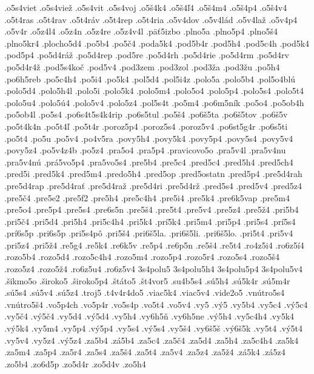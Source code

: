 {.o5s4viet
.o5s4vie\v z
.o5s4vit
.o5s4voj
.o5\v s4k4
.o5\v s4\v l4
.o5\v s4m4
.o5\v s4p4
.o5\v s4v4
.o5t4ras
.o5t4rav
.o5t4r\'av
.o5t4rep
.o5t4ria
.o5v4dov
.o5v4l\'ad
.o5v4la\v z
.o5v4p4
.o5v4r
.o5z4l4
.o5z4n
.o5z4re
.o5z4v4l
.p\"a\v t5izbo
.plno5a
.plno5p4
.plno5\v s4
.plno5kr4
.plocho5d4
.po5b4
.po5\v c4
.poda5k4
.pod5b4r
.pod5h4
.pod5c4h
.pod5k4
.pod5p4
.po5d4r\'a\v z
.po5d4rep
.pod5re
.po5d4rh
.po5d4rie
.po5d4rm
.po5d4rv
.po5d4r4\v z
.pod5s4ko\v c
.pod5v4
.pod3zem
.pod3zol
.pod3\v za
.pod3\v zu
.po5h4
.po6h5reb
.po5c4h4
.po5i4
.po5k4
.pol5d4
.pol5i4z
.polo5a
.polo5b4
.pol5o4bl\'u
.polo5d4
.polo5h4l
.polo5i
.polo5k4
.polo5m4
.polo5o4
.polo5p4
.polo5s4
.polo5t4
.polo5u4
.polo5\'u4
.polo5v4
.polo5z4
.pol5s4t
.po5m4
.po6m5n\'ik
.po5o4
.po5ob4h
.po5ob4l
.po5s4
.po6s4t5s4k4rip
.po6s5tul
.po5\v s4
.po6\v s5ta
.po6\v s5tov
.po6\v s5v
.po5t4k4n
.po5t4\v l
.po5t4r
.poroz5p4
.poroz5s4
.poroz5v4
.po6st5g4r
.po6s5ti
.po5t4
.po5u
.po5v4
.po4v5ra
.povy5h4
.povy5k4
.povy5p4
.povy5s4
.povy5v4
.povy5z4
.po5v4z4b
.po5z4
.pra5o4
.pra5p4
.pravicovo5o
.pra5v4l
.pra5v4nu
.pra5v4n\'u
.pr\'a5vo5p4
.pra5vo5s4
.pre5b4
.pre5c4
.pred5c4
.pred5h4
.pred5ch4
.pred5i
.pred5k4
.pred5m4
.predo5h4
.pred5op
.pred5ostatn
.pred5p4
.pre5d4rah
.pre5d4rap
.pre5d4ra\v t
.pre5d4ra\v z
.pre5d4ri
.pre5d4r\v z
.pred5s4
.pred5v4
.pred5z4
.pre5\v c4
.pre5e2
.pre5f2
.pre5h4
.pre5c4h4
.pre5i4
.pre5k4
.pre6k5vap
.pre5m4
.pre5o4
.pre5p4
.pre5s4
.pre6s5n
.pre5\v s4
.pre5t4
.pre5v4
.pre5z4
.pre5\v z4
.pri5b4
.pri5\v c4
.pri5d4
.pri5h4
.pri5c4h4
.pri5k4
.pr\'i5k4
.pri5m4
.pri5p4
.pri5s4
.pr\'i5s4
.pr\'i6s5p
.pri6s5p
.pri5s4p\^o
.pri5\v s4
.pri6\v s5la.
.pri6\v s5li.
.pri6\v s5lo.
.pri5t4
.pri5v4
.pri5z4
.pri5\v z4
.re5g4
.re5k4
.re6k5v
.re5p4
.re6p5n
.re5\v s4
.re5t4
.ro4z5i4
.ro6z5\'i4
.rozo5b4
.rozo5d4
.rozo5c4h4
.rozo5m4
.rozo5p4
.rozo5r4
.rozo5s4
.rozo5\v s4
.rozo5z4
.rozo5\v z4
.ro6z5u4
.ro6z5v4
3s4polu5
3s4polu5h4
3s4polu5p4
3s4polu5v4
.\v sikmo5o
.\v siroko5
.\v siroko5p4
.\v st\'ato5
.\v st4vor5
.su4b5s4
.s\'u5h4
.s\'u5k4r
.s\'u5m4r
.s\'u5s4
.s\'u5v4
.s\'u5z4
.troj5
.t4v4r4do5
.viac5k4
.viac5v4
.vide2o5
.vn\'utro5s4
.vn\'utro5\v s4
.vo5p4ch
.vo5p4r
.vo5s4p
.vo5t4
.vo5v4
.vy5
.v\'y5
.vy5b4
.vy5c4
.v\'y5c4
.vy5\v c4
.v\'y5\v c4
.vy5d4
.v\'y5d4
.vy5h4
.vy6h5\v n
.vy6h5ne
.v\'y5h4
.vy5c4h4
.vy5k4
.v\'y5k4
.vy5m4
.vy5p4
.v\'y5p4
.vy5s4
.v\'y5s4
.vy5\v s4
.vy6\v s5\v s
.v\'y6\v s5k
.vy5t4
.v\'y5t4
.vy5v4
.vy5z4
.v\'y5z4
.za5b4
.z\'a5b4
.za5c4
.za5\v c4
.za5d4
.za5h4
.za5c4h4
.za5k4
.za5m4
.za5p4
.za5r4
.za5s4
.za5\v s4
.za5t4
.za5v4
.za5z4
.za5\v z4
.z\'a5k4
.z\'a5z4
.zo5b4
.zo6d5p
.zo5d4r
.zo5d4v
.zo5h4
}
